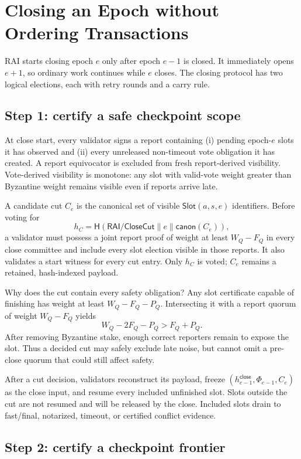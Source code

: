 \documentclass[sigplan,review,anonymous]{acmart}
\newcommand{\sys}{\textsc{RAI}\xspace}
\newcommand{\Slot}{\mathsf{Slot}}
\newcommand{\hash}{\mathsf{H}}
\newcommand{\canon}{\mathsf{canon}}
\newcommand{\frontier}{\Phi}
\newcommand{\closehash}{h^{\mathsf{close}}}
\begin{document}
\section{Closing an Epoch without Ordering Transactions}
\label{sec:close}

\sys starts closing epoch $e$ only after epoch $e-1$ is closed.  It immediately opens $e+1$, so ordinary work continues while $e$ closes.  The closing protocol has two logical elections, each with retry rounds and a carry rule.

\subsection{Step 1: certify a safe checkpoint scope}

At close start, every validator signs a report containing (i) pending epoch-$e$ slots it has observed and (ii) every unreleased non-timeout vote obligation it has created.  A report equivocator is excluded from fresh report-derived visibility.  Vote-derived visibility is monotone: any slot with valid-vote weight greater than Byzantine weight remains visible even if reports arrive late.

A candidate cut $C_e$ is the canonical set of visible $\Slot(a,s,e)$ identifiers.  Before voting for
\[
 h_C=\hash(\textsf{RAI/CloseCut}\parallel e\parallel\canon(C_e)),
\]
a validator must possess a joint report proof of weight at least $W_Q-F_Q$ in every close committee and include every slot election visible in those reports.  It also validates a start witness for every cut entry.  Only $h_C$ is voted; $C_e$ remains a retained, hash-indexed payload.

Why does the cut contain every safety obligation?  Any slot certificate capable of finishing has weight at least $W_Q-F_Q-P_Q$.  Intersecting it with a report quorum of weight $W_Q-F_Q$ yields
\[
 W_Q-2F_Q-P_Q > F_Q+P_Q.
\]
After removing Byzantine stake, enough correct reporters remain to expose the slot.  Thus a decided cut may safely exclude late noise, but cannot omit a pre-close quorum that could still affect safety.

After a cut decision, validators reconstruct its payload, freeze
$(\closehash_{e-1},\frontier_{e-1},C_e)$ as the close input, and resume every included unfinished slot.  Slots outside the cut are not resumed and will be released by the close.  Included slots drain to fast/final, notarized, timeout, or certified conflict evidence.

\subsection{Step 2: certify a checkpoint frontier}
\end{document}
